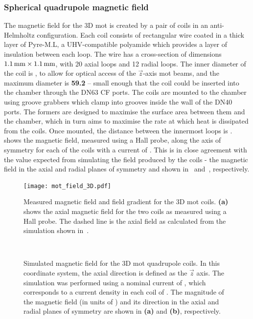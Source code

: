 \subsubsection{Spherical quadrupole magnetic field}
The magnetic field for the 3D \ac{mot} is created by a pair of coils in an
anti-Helmholtz configuration. Each coil consists of
rectangular wire coated in a  thick layer of Pyre-M.L,
a UHV-compatible polyamide which provides a layer of insulation between each
loop. The wire has a cross-section of dimensions \(\sivalue{1.1}{\milli\metre}
\times \sivalue{1.1}{\milli\metre}\), with 20 axial loops and 12 radial loops.
The inner diameter of the coil is , to allow for
optical access of the \(\vec{z}\)-axis \ac{mot} beams, and the maximum diameter
is \textbf{59.2}\sivalue{}{\milli\metre} -- small enough that the coil could be
inserted into the chamber through the DN63 CF ports. The coils are mounted to
the chamber using groove grabbers which clamp into grooves inside the wall of
the DN40 ports. The formers are designed to maximise the surface area between
them and the chamber, which in turn aims to maximise the rate at which heat is
dissipated from the coils. Once mounted, the distance between the innermost
loops is .  shows the
magnetic field, measured using a Hall probe, along the axis of symmetry for each
of the coils with a current of . This
is in close agreement with the value expected from simulating the field produced
by the coils - the magnetic field in the axial and radial planes of symmetry and
shown in~ and~,
respectively.
\begin{figure}
	\centering
	\def\svgwidth{\columnwidth}
	\texttt{[image: mot\_field\_3D.pdf]}
	\caption[Measured magnetic field and field gradient for the 3D \ac{mot}
		coils]{Measured magnetic field and field gradient for the 3D \ac{mot}
		coils. \textbf{(a)} shows the axial magnetic field for the two coils as
		measured using a Hall probe. The dashed line is the axial field as
		calculated from the simulation shown
		in~.}
	\label{fig:mot_coil_plots}
\end{figure}
\begin{figure}
	\centering
	\def\svgwidth{\columnwidth}
	\\
	\caption[Simulated magnetic field for the 3D \ac{mot} quadrupole
		coils]{Simulated magnetic field for the 3D \ac{mot} quadrupole coils. In
		this coordinate system, the axial direction is defined as the
		\(\vec{z}\) axis. The simulation was performed using a nominal current
		of , which corresponds to a current density in
		each coil of . The
		magnitude of the magnetic field (in units of \sivalue{}{\gauss}) and its
		direction in the axial and radial planes of symmetry are shown in
		\textbf{(a)} and
		\textbf{(b)}, respectively.}
	\label{fig:3D_mot_field_sim}
\end{figure}
